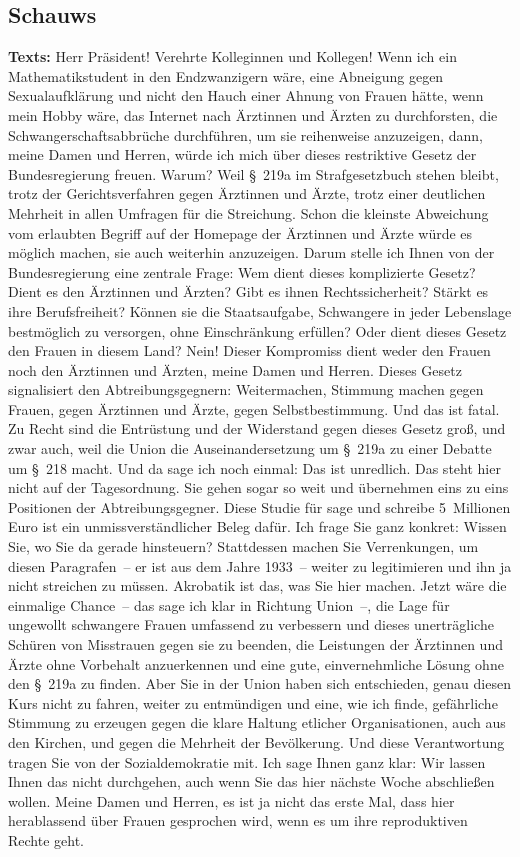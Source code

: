 \documentclass{article}
\begin{document}
\subsection{Schauws}
\noindent\textbf{Texts:} Herr Präsident! Verehrte Kolleginnen und Kollegen! Wenn ich ein Mathematikstudent in den Endzwanzigern wäre, eine Abneigung gegen Sexualaufklärung und nicht den Hauch einer Ahnung von Frauen hätte, wenn mein Hobby wäre, das Internet nach Ärztinnen und Ärzten zu durchforsten, die Schwangerschaftsabbrüche durchführen, um sie reihenweise anzuzeigen, dann, meine Damen und Herren, würde ich mich über dieses restriktive Gesetz der Bundesregierung freuen. Warum? Weil § 219a im Strafgesetzbuch stehen bleibt, trotz der Gerichtsverfahren gegen Ärztinnen und Ärzte, trotz einer deutlichen Mehrheit in allen Umfragen für die Streichung. Schon die kleinste Abweichung vom erlaubten Begriff auf der Homepage der Ärztinnen und Ärzte würde es möglich machen, sie auch weiterhin anzuzeigen. Darum stelle ich Ihnen von der Bundesregierung eine zentrale Frage: Wem dient dieses komplizierte Gesetz?  Dient es den Ärztinnen und Ärzten? Gibt es ihnen Rechtssicherheit? Stärkt es ihre Berufsfreiheit? Können sie die Staatsaufgabe, Schwangere in jeder Lebenslage bestmöglich zu versorgen, ohne Einschränkung erfüllen? Oder dient dieses Gesetz den Frauen in diesem Land? Nein! Dieser Kompromiss dient weder den Frauen noch den Ärztinnen und Ärzten, meine Damen und Herren.  Dieses Gesetz signalisiert den Abtreibungsgegnern: Weitermachen, Stimmung machen gegen Frauen, gegen Ärztinnen und Ärzte, gegen Selbstbestimmung. Und das ist fatal.  Zu Recht sind die Entrüstung und der Widerstand gegen dieses Gesetz groß, und zwar auch, weil die Union die Auseinandersetzung um § 219a zu einer Debatte um § 218 macht. Und da sage ich noch einmal: Das ist unredlich. Das steht hier nicht auf der Tagesordnung.  Sie gehen sogar so weit und übernehmen eins zu eins Positionen der Abtreibungsgegner. Diese Studie für sage und schreibe 5 Millionen Euro ist ein unmissverständlicher Beleg dafür. Ich frage Sie ganz konkret: Wissen Sie, wo Sie da gerade hinsteuern?  Stattdessen machen Sie Verrenkungen, um diesen Paragrafen – er ist aus dem Jahre 1933 – weiter zu legitimieren und ihn ja nicht streichen zu müssen. Akrobatik ist das, was Sie hier machen. Jetzt wäre die einmalige Chance – das sage ich klar in Richtung Union –, die Lage für ungewollt schwangere Frauen umfassend zu verbessern und dieses unerträgliche Schüren von Misstrauen gegen sie zu beenden,  die Leistungen der Ärztinnen und Ärzte ohne Vorbehalt anzuerkennen und eine gute, einvernehmliche Lösung ohne den § 219a zu finden. Aber Sie in der Union haben sich entschieden, genau diesen Kurs nicht zu fahren, weiter zu entmündigen und eine, wie ich finde, gefährliche Stimmung zu erzeugen  gegen die klare Haltung etlicher Organisationen, auch aus den Kirchen, und gegen die Mehrheit der Bevölkerung. Und diese Verantwortung tragen Sie von der Sozialdemokratie mit. Ich sage Ihnen ganz klar: Wir lassen Ihnen das nicht durchgehen, auch wenn Sie das hier nächste Woche abschließen wollen.  Meine Damen und Herren, es ist ja nicht das erste Mal, dass hier herablassend über Frauen gesprochen wird, wenn es um ihre reproduktiven Rechte geht.  
\end{document}
